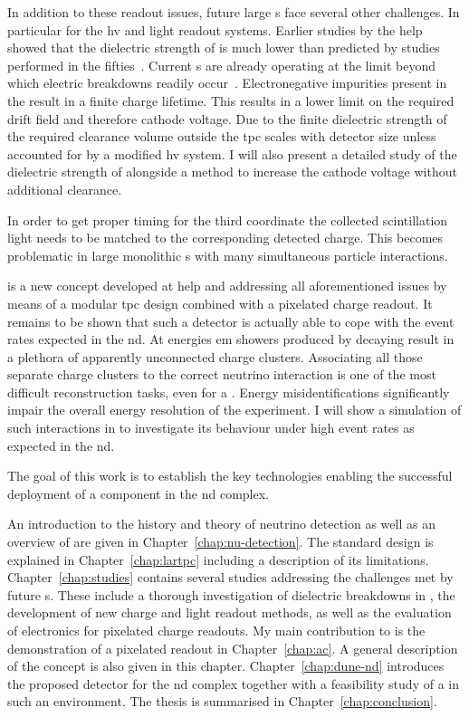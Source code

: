 In addition to these readout issues, future large \lartpc{}s face several other challenges.
In particular for the \gls{hv} and light readout systems.
Earlier studies by the \gls{help}~\cite{breakdown_14} showed that the dielectric strength of \lar{} is much lower than predicted by studies performed in the fifties~\cite{swan1, swan2}.
Current \lartpc{}s are already operating at the limit beyond which electric breakdowns readily occur~\cite{uboone}.
Electronegative impurities present in the \lar{} result in a finite charge lifetime.
This results in a lower limit on the required drift field and therefore cathode voltage.
Due to the finite dielectric strength of \lar{} the required clearance volume outside the \gls{tpc} scales with detector size unless accounted for by a modified \gls{hv} system.
I will also present a detailed study of the dielectric strength of \lar{} alongside a method to increase the cathode voltage without additional clearance.

In order to get proper timing for the third coordinate the collected scintillation light needs to be matched to the corresponding detected charge.
This becomes problematic in large monolithic \lartpc{}s with many simultaneous particle interactions.

\AC{} is a new \lartpc{} concept developed at \gls{help} and addressing all aforementioned issues by means of a modular \gls{tpc} design combined with a pixelated charge readout.
It remains to be shown that such a detector is actually able to cope with the event rates expected in the \dune{} \gls{nd}.
At \dune{} energies \gls{em} showers produced by decaying \Pgpz result in a plethora of apparently unconnected charge clusters.
Associating all those separate charge clusters to the correct neutrino interaction is one of the most difficult reconstruction tasks, even for a \lartpc{}.
Energy misidentifications significantly impair the overall energy resolution of the experiment.
I will show a simulation of such interactions in \AC{} to investigate its behaviour under high event rates as expected in the \dune{} \gls{nd}.

The goal of this work is to establish the key technologies enabling the successful deployment of a \lartpc{} component in the \dune{} \gls{nd} complex.

An introduction to the history and theory of neutrino detection as well as an overview of \dune{} are given in Chapter~\ref{chap:nu-detection}.
The standard \lartpc{} design is explained in Chapter~\ref{chap:lartpc} including a description of its limitations.
Chapter~\ref{chap:studies} contains several studies addressing the challenges met by future \lartpc{}s.
These include a thorough investigation of dielectric breakdowns in \lar{}, the development of new charge and light readout methods, as well as the evaluation of electronics for pixelated charge readouts.
My main contribution to \AC{} is the demonstration of a pixelated \lartpc{} readout in Chapter~\ref{chap:ac}.
A general description of the \AC{} concept is also given in this chapter.
Chapter~\ref{chap:dune-nd} introduces the proposed \AC{} detector for the \dune{} \gls{nd} complex together with a feasibility study of a \lartpc{} in such an environment.
The thesis is summarised in Chapter~\ref{chap:conclusion}.
